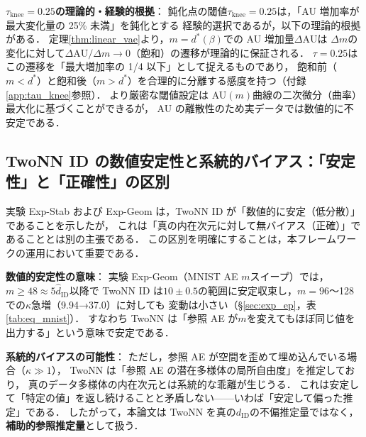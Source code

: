 \documentclass[11pt,a4paper]{jsarticle}
\begin{document}
\textbf{$\tau_{\mathrm{knee}} = 0.25$の理論的・経験的根拠}：
鈍化点の閾値$\tau_{\mathrm{knee}} = 0.25$は，「AU 増加率が最大変化量の 25\% 未満」を鈍化とする
経験的選択であるが，以下の理論的根拠がある．
定理\ref{thm:linear_vae}より，$m = d^*(\beta)$での AU 増加量$\Delta\mathrm{AU}$は
$\Delta m$の変化に対して$\Delta\mathrm{AU}/\Delta m \to 0$（飽和）の遷移が理論的に保証される．
$\tau = 0.25$はこの遷移を「最大増加率の 1/4 以下」として捉えるものであり，
飽和前（$m < d^*$）と飽和後（$m > d^*$）を合理的に分離する感度を持つ（付録\ref{app:tau_knee}参照）．
より厳密な閾値設定は AU$(m)$曲線の二次微分（曲率）最大化に基づくことができるが，
AU の離散性のため実データでは数値的に不安定である．

\subsection{TwoNN ID の数値安定性と系統的バイアス：「安定性」と「正確性」の区別}\label{sec:disc_twonn_bias}

実験 Exp-Stab および Exp-Geom は，TwoNN ID が「数値的に安定（低分散）」であることを示したが，
これは「真の内在次元に対して無バイアス（正確）」であることとは別の主張である．
この区別を明確にすることは，本フレームワークの運用において重要である．

\textbf{数値的安定性の意味}：
実験 Exp-Geom（MNIST AE $m$スイープ）では，$m \geq 48 \approx 5\hat{d}_\mathrm{ID}$以降で
TwoNN ID は$10 \pm 0.5$の範囲に安定収束し，$m = 96$〜128 での$\kappa$急増（9.94→37.0）に対しても
変動は小さい（§\ref{sec:exp_ep}，表\ref{tab:eq_mnist}）．
すなわち TwoNN は「参照 AE が$m$を変えてもほぼ同じ値を出力する」という意味で安定である．

\textbf{系統的バイアスの可能性}：
ただし，参照 AE が空間を歪めて埋め込んでいる場合（$\kappa \gg 1$），
TwoNN は「参照 AE の潜在多様体の局所自由度」を推定しており，
真のデータ多様体の内在次元とは系統的な乖離が生じうる．
これは安定して「特定の値」を返し続けることと矛盾しない——いわば「安定して偏った推定」である．
したがって，本論文は TwoNN を真の$d_\mathrm{ID}$の不偏推定量ではなく，
\textbf{補助的参照推定量}として扱う．
\end{document}
